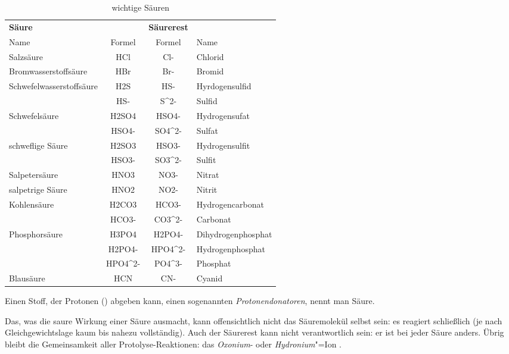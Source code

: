 \documentclass{arbeitsblatt}
\begin{document}
\begin{table}
  \centering
  \caption{wichtige Säuren}\label{tab:saeuren}
  \begin{tabular}{lCCl}
    \toprule
      \bfseries Säure          &         & \textbf{Säurerest} \\
      Name                     & Formel  & Formel  & Name \\
    \midrule
      Salzsäure                & HCl     & Cl-     & Chlorid \\
      Bromwasserstoffsäure     & HBr     & Br-     & Bromid \\
      Schwefelwasserstoffsäure & H2S     & HS-     & Hyrdogensulfid \\
                               & HS-     & S^2-    & Sulfid \\
      Schwefelsäure            & H2SO4   & HSO4-   & Hydrogensufat \\
                               & HSO4-   & SO4^2-  & Sulfat \\
      schweflige Säure         & H2SO3   & HSO3-   & Hydrogensulfit \\
                               & HSO3-   & SO3^2-  & Sulfit \\
      Salpetersäure            & HNO3    & NO3-    & Nitrat \\
      salpetrige Säure         & HNO2    & NO2-    & Nitrit \\
      Kohlensäure              & H2CO3   & HCO3-   & Hydrogencarbonat \\
                               & HCO3-   & CO3^2-  & Carbonat \\
      Phosphorsäure            & H3PO4   & H2PO4-  & Dihydrogenphosphat \\
                               & H2PO4-  & HPO4^2- & Hydrogenphosphat \\
                               & HPO4^2- & PO4^3-  & Phosphat \\
      Blausäure                & HCN     & CN-     & Cyanid \\
    \bottomrule
  \end{tabular}
\end{table}

\begin{definition}
  Einen Stoff, der Protonen (\Hpl) abgeben kann, einen sogenannten
  \emph{Protonendonatoren}, nennt man Säure.
\end{definition}

Das, was die saure Wirkung einer Säure ausmacht, kann offensichtlich nicht das
Säuremolekül selbst sein: es reagiert schließlich (je nach Gleichgewichtslage
kaum bis nahezu vollständig).  Auch der Säurerest kann nicht verantwortlich
sein: er ist bei jeder Säure anders.  Übrig bleibt die Gemeinsamkeit aller
Protolyse-Reaktionen: das \emph{Oxonium}- oder
\emph{Hydronium}"=Ion .
\end{document}
